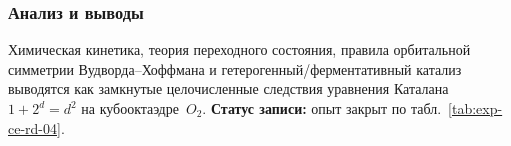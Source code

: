 \subsubsection*{Анализ и выводы}
Химическая кинетика, теория переходного состояния, правила орбитальной симметрии Вудворда--Хоффмана и гетерогенный/ферментативный катализ выводятся как замкнутые целочисленные следствия уравнения Каталана $1+2^d=d^2$ на кубооктаэдре~$O_2$.
\textbf{Статус записи:} опыт закрыт по табл.~\ref{tab:exp-ce-rd-04}.
